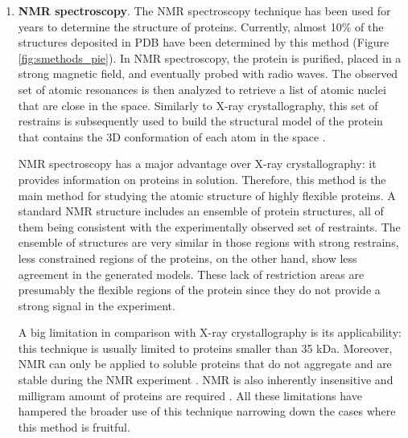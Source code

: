 \documentclass[12pt, a4paper,twoside]{tesi_upf}
\begin{document}
\begin{enumerate}[label=(\alph*)]
\item \textbf{NMR spectroscopy}. The NMR spectroscopy technique has been used for years to determine the structure of proteins. Currently, almost 10$\%$ of the structures deposited in PDB have been determined by this method (Figure \ref{fig:smethods_pie}). In NMR spectroscopy, the protein is purified, placed in a strong magnetic field, and eventually probed with radio waves. The observed set of atomic resonances is then analyzed to retrieve a list of atomic nuclei that are close in the space. Similarly to X-ray crystallography, this set of restrains is subsequently used to build the structural model of the protein that contains the 3D conformation of each atom in the space \cite{Wider2000}.   
\par NMR spectroscopy has a major advantage over X-ray crystallography: it provides information on proteins in solution. Therefore, this method is the main method for studying the atomic structure of highly flexible proteins. A standard NMR structure includes an ensemble of protein structures, all of them being consistent with the experimentally observed set of restraints. The ensemble of structures are very similar in those regions with strong restrains, less constrained regions of the proteins, on the other hand, show less agreement in the generated models. These lack of restriction areas are presumably the flexible regions of the protein since they do not provide a strong signal in the experiment.   
\par A big limitation in comparison with X-ray crystallography is its applicability: this technique is usually limited to proteins smaller than 35 kDa. Moreover, NMR can only be applied to soluble proteins that do not aggregate and are stable during the NMR experiment \cite{Wider2000, Gadian1993}. NMR is also inherently insensitive and milligram amount of proteins are required \cite{Gadian1993}. All these limitations have hampered the broader use of this technique narrowing down the cases where this method is fruitful.


\end{enumerate}
\end{document}
